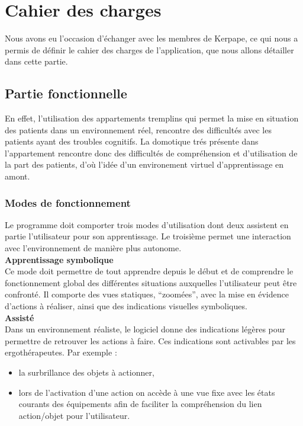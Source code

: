 \section{Cahier des charges}

Nous avons eu l'occasion d'échanger avec les membres de Kerpape, ce qui nous a permis de définir le cahier des charges de l'application, que nous allons détailler dans cette partie.

\subsection{Partie fonctionnelle}

En effet, l'utilisation des appartements tremplins qui permet la mise en situation des patients dans un environnement réel, rencontre des difficultés avec les patients ayant des troubles cognitifs. La domotique trés présente dans l'appartement rencontre donc des difficultés de compréhension et d'utilisation de la part des patients, d'où l'idée d'un environement virtuel d'apprentissage en amont.

\subsubsection{Modes de fonctionnement}

Le programme doit comporter trois modes d'utilisation dont deux assistent en partie l'utilisateur pour son apprentissage. Le troisième permet une interaction avec l'environnement de manière plus autonome.\\

\textbf{Apprentissage symbolique}
\\

Ce mode doit permettre de tout apprendre depuis le début et de comprendre le fonctionnement global des différentes situations auxquelles l'utilisateur peut être confronté. Il comporte des vues statiques, \enquote{zoomées}, avec la mise en évidence d'actions à réaliser, ainsi que des indications visuelles symboliques.\\

\textbf{Assisté}
\\

Dans un environnement réaliste, le logiciel donne des indications légères pour permettre de retrouver les actions à faire. Ces indications sont activables par les ergothérapeutes. Par exemple :
\begin{itemize}
  \item la surbrillance des objets à actionner,
  \item lors de l'activation d'une action on accède à une vue fixe avec les états courants des équipements afin de faciliter la compréhension du lien action/objet pour l'utilisateur. \\
\end{itemize}

